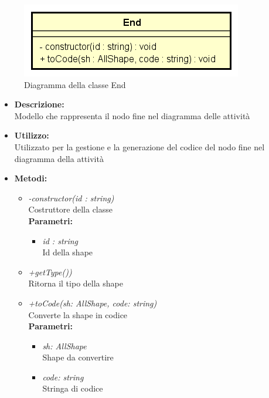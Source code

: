 \begin{figure}[h!]
	\centering
	\includegraphics[scale=0.8]{res/sections/SpecificaFrontEnd/Services/Disegnetti/end.png}
	\caption{Diagramma della classe End}
\end{figure}

\begin{itemize}
	\item \textbf{Descrizione:}\\
	Modello che rappresenta il nodo fine nel diagramma delle attività
	\item \textbf{Utilizzo:}\\
	Utilizzato per la gestione e la generazione del codice del nodo fine nel diagramma della attività
	\item \textbf{Metodi:}
		\begin{itemize}
			\item \emph{-constructor(id : string)}\\
    		Costruttore della classe\\
    		\textbf{Parametri:}
    		\begin{itemize}
    			\item \emph{id : string}\\
    			Id della shape
    		\end{itemize}
			\item \emph{+getType())}\\
    		Ritorna il tipo della shape
			\item \emph{+toCode(sh: AllShape, code: string)}\\
    		Converte la shape in codice\\
    		\textbf{Parametri:}
    		\begin{itemize}
    			\item \emph{sh: AllShape}\\
    			Shape da convertire
    			\item \emph{code: string}\\
    			Stringa di codice
    		\end{itemize}
    	\end{itemize}
\end{itemize}